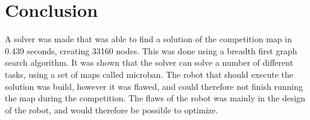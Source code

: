 \section{Conclusion}
A solver was made that was able to find a solution of the competition map in 0.439 seconds, creating 33160 nodes.
This was done using a breadth first graph search algorithm. 
It was shown that the solver can solve a number of different tasks, using a set of maps called microban. 
The robot that should execute the solution was build, however it was flawed, and could therefore not finish running the map during the competition.
The flaws of the robot was mainly in the design of the robot, and would therefore be possible to optimize. 